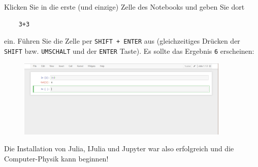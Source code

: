 \documentclass[11pt, a4paper]{scrartcl}
\begin{document}
	Klicken Sie in die erste (und einzige) Zelle des Notebooks und geben Sie dort
	
	\begin{lstlisting}
	3+3
	\end{lstlisting}
	ein. Führen Sie die Zelle per \texttt{SHIFT + ENTER} aus (gleichzeitiges Drücken der \texttt{SHIFT} bzw. \texttt{UMSCHALT} und der \texttt{ENTER} Taste). Es sollte das Ergebnis \texttt{6} erscheinen:

	\begin{figure}[h!]
	\centering
	\includegraphics[width=0.9\textwidth]{imgs/jupyter_notebook_test.png}
	\end{figure}	

	Die Installation von Julia, IJulia und Jupyter war also erfolgreich und die Computer-Physik kann beginnen!
	
\end{document}
